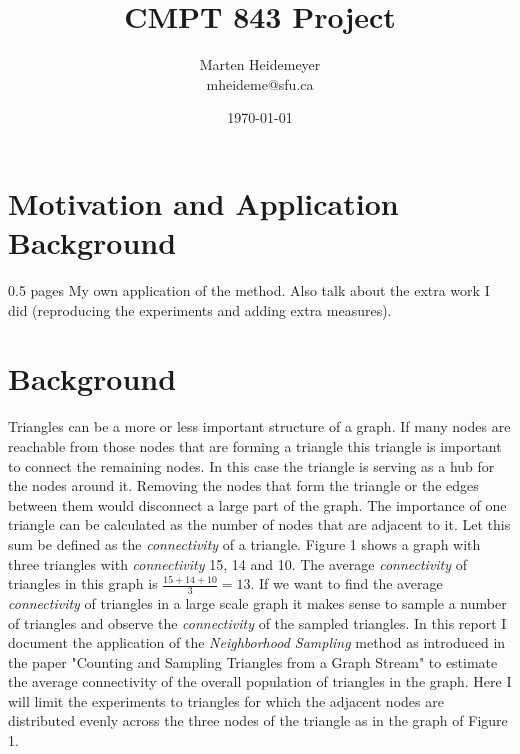 \documentclass[12pt,twoside,a4paper]{report}
\title{CMPT 843 Project}
\author{Marten Heidemeyer\\mheideme@sfu.ca}
\date{\today}
\begin{document}
\maketitle
\section{Motivation and Application Background}
0.5 pages
My own application of the method. Also talk about the extra work I did (reproducing the experiments and adding extra measures).
\section{Background}
Triangles can be a more or less important structure of a graph. If many nodes are reachable from those nodes that are forming a triangle this triangle is important to connect the remaining nodes. In this case the triangle is serving as a hub for the nodes around it. Removing the nodes that form the triangle or the edges between them would disconnect a large part of the graph. The importance of one triangle can be calculated as the number of nodes that are adjacent to it. Let this sum be defined as the \textit{connectivity} of a triangle. Figure 1 shows a graph with three triangles with \textit{connectivity} 15, 14 and 10. The average \textit{connectivity} of triangles in this graph is $\frac{15+14+10}{3}=13$. If we want to find the average \textit{connectivity} of triangles in a large scale graph it makes sense to sample a number of triangles and observe the \textit{connectivity} of the sampled triangles. In this report I document the application of the \textit{Neighborhood Sampling} method as introduced in the paper "Counting and Sampling Triangles from a Graph Stream" to estimate the average connectivity of the overall population of triangles in the graph. Here I will limit the experiments to triangles for which the adjacent nodes are distributed evenly across the three nodes of the triangle as in the graph of Figure 1.
 
\end{document}
